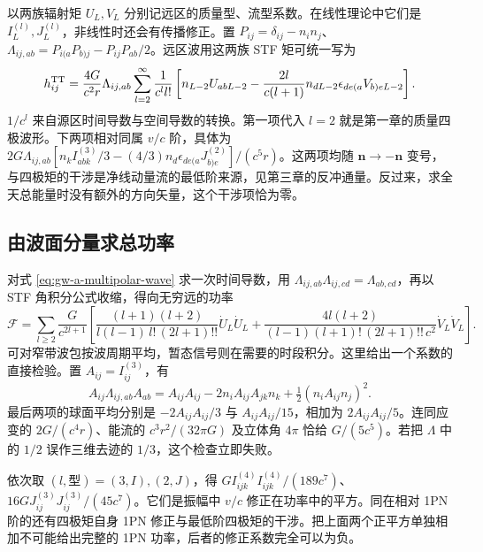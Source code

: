 以两族辐射矩 $U_L,V_L$ 分别记远区的质量型、流型系数。在线性理论中它们是 $I_L^{(l)},J_L^{(l)}$，非线性时还会有传播修正。置 $P_{ij}=\delta_{ij}-n_i n_j$、$\Lambda_{ij,ab}=P_{i(a}P_{b)j}-P_{ij}P_{ab}/2$。远区波用这两族 STF 矩可统一写为
\begin{equation}
 h^{\rm TT}_{ij}=\frac{4G}{c^2r}\Lambda_{ij,ab}
 \sum_{l=2}^{\infty}\frac{1}{c^l l!}
 \left[n_{L-2}U_{abL-2}
  -\frac{2l}{c(l+1)}n_{dL-2}\epsilon_{de(a}V_{b)eL-2}\right].
 \label{eq:gw-a-multipolar-wave}
\end{equation}
$1/c^l$ 来自源区时间导数与空间导数的转换。第一项代入 $l=2$ 就是第一章的质量四极波形。下两项相对同属 $v/c$ 阶，具体为 $2G\Lambda_{ij,ab} [n_k I_{abk}^{(3)}/3-(4/3)n_d\epsilon_{de(a}J^{(2)}_{b)e}]/(c^5r)$。这两项均随 $\bm n\to-\bm n$ 变号，与四极矩的干涉是净线动量流的最低阶来源，见第三章的反冲通量。反过来，求全天总能量时没有额外的方向矢量，这个干涉项恰为零。

\subsection{由波面分量求总功率}

对式 \eqref{eq:gw-a-multipolar-wave} 求一次时间导数，用 $\Lambda_{ij,ab}\Lambda_{ij,cd}=\Lambda_{ab,cd}$，再以 STF 角积分公式收缩，得向无穷远的功率
\begin{equation}
 \mathcal F=\sum_{l\ge2}\frac{G}{c^{2l+1}}
 \left[\frac{(l+1)(l+2)}{l(l-1)\,l!\,(2l+1)!!}\dot U_L\dot U_L
 +\frac{4l(l+2)}{(l-1)(l+1)!\,(2l+1)!!\,c^2}\dot V_L\dot V_L\right].
 \label{eq:gw-a-multiflux}
\end{equation}
可对窄带波包按波周期平均，暂态信号则在需要的时段积分。这里给出一个系数的直接检验。置 $A_{ij}=I_{ij}^{(3)}$，有
\[
 A_{ij}\Lambda_{ij,ab}A_{ab}
       =A_{ij}A_{ij}-2n_iA_{ij}A_{jk}n_k
                        +\tfrac12(n_iA_{ij}n_j)^2.
\]
最后两项的球面平均分别是 $-2A_{ij}A_{ij}/3$ 与 $A_{ij}A_{ij}/15$，相加为 $2A_{ij}A_{ij}/5$。连同应变的 $2G/(c^4r)$、能流的 $c^3r^2/(32\pi G)$ 及立体角 $4\pi$ 恰给 $G/(5c^5)$。若把 $\Lambda$ 中的 $1/2$ 误作三维去迹的 $1/3$，这个检查立即失败。

依次取 $(l,\text{型})=(3,I),(2,J)$，得 $G I_{ijk}^{(4)}I_{ijk}^{(4)}/(189c^7)$、$16G J_{ij}^{(3)}J_{ij}^{(3)}/(45c^7)$。它们是振幅中 $v/c$ 修正在功率中的平方。同在相对 1PN 阶的还有四极矩自身 1PN 修正与最低阶四极矩的干涉。把上面两个正平方单独相加不可能给出完整的 1PN 功率，后者的修正系数完全可以为负。


